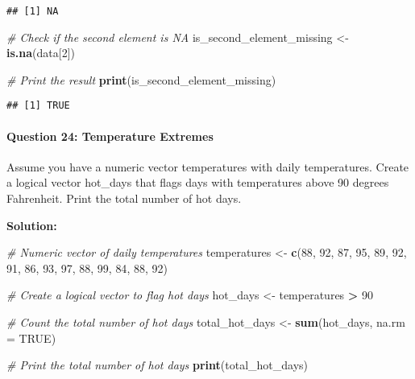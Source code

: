 \documentclass[
]{article}
\newenvironment{Shaded}{\begin{snugshade}}{\end{snugshade}}
\newcommand{\AttributeTok}[1]{\textcolor[rgb]{0.13,0.29,0.53}{#1}}
\newcommand{\CommentTok}[1]{\textcolor[rgb]{0.56,0.35,0.01}{\textit{#1}}}
\newcommand{\ConstantTok}[1]{\textcolor[rgb]{0.56,0.35,0.01}{#1}}
\newcommand{\DecValTok}[1]{\textcolor[rgb]{0.00,0.00,0.81}{#1}}
\newcommand{\FunctionTok}[1]{\textcolor[rgb]{0.13,0.29,0.53}{\textbf{#1}}}
\newcommand{\NormalTok}[1]{#1}
\newcommand{\OtherTok}[1]{\textcolor[rgb]{0.56,0.35,0.01}{#1}}
\newcommand{\SpecialCharTok}[1]{\textcolor[rgb]{0.81,0.36,0.00}{\textbf{#1}}}
\begin{document}
\begin{verbatim}
## [1] NA
\end{verbatim}

\begin{Shaded}
\begin{Highlighting}[]
\CommentTok{\# Check if the second element is NA}
\NormalTok{is\_second\_element\_missing }\OtherTok{\textless{}{-}} \FunctionTok{is.na}\NormalTok{(data[}\DecValTok{2}\NormalTok{])}

\CommentTok{\# Print the result}
\FunctionTok{print}\NormalTok{(is\_second\_element\_missing)}
\end{Highlighting}
\end{Shaded}

\begin{verbatim}
## [1] TRUE
\end{verbatim}

\hypertarget{question-24-temperature-extremes}{%
\paragraph{Question 24: Temperature
Extremes}\label{question-24-temperature-extremes}}

Assume you have a numeric vector temperatures with daily temperatures.
Create a logical vector hot\_days that flags days with temperatures
above 90 degrees Fahrenheit. Print the total number of hot days.

\textbf{Solution:}

\begin{Shaded}
\begin{Highlighting}[]
\CommentTok{\# Numeric vector of daily temperatures}
\NormalTok{temperatures }\OtherTok{\textless{}{-}} \FunctionTok{c}\NormalTok{(}\DecValTok{88}\NormalTok{, }\DecValTok{92}\NormalTok{, }\DecValTok{87}\NormalTok{, }\DecValTok{95}\NormalTok{, }\DecValTok{89}\NormalTok{, }\DecValTok{92}\NormalTok{, }\DecValTok{91}\NormalTok{, }\DecValTok{86}\NormalTok{, }\DecValTok{93}\NormalTok{, }\DecValTok{97}\NormalTok{, }\DecValTok{88}\NormalTok{, }\DecValTok{99}\NormalTok{, }\DecValTok{84}\NormalTok{, }\DecValTok{88}\NormalTok{, }\DecValTok{92}\NormalTok{)}

\CommentTok{\# Create a logical vector to flag hot days}
\NormalTok{hot\_days }\OtherTok{\textless{}{-}}\NormalTok{ temperatures }\SpecialCharTok{\textgreater{}} \DecValTok{90}

\CommentTok{\# Count the total number of hot days}
\NormalTok{total\_hot\_days }\OtherTok{\textless{}{-}} \FunctionTok{sum}\NormalTok{(hot\_days, }\AttributeTok{na.rm =} \ConstantTok{TRUE}\NormalTok{)}

\CommentTok{\# Print the total number of hot days}
\FunctionTok{print}\NormalTok{(total\_hot\_days)}
\end{Highlighting}
\end{Shaded}
\end{document}
